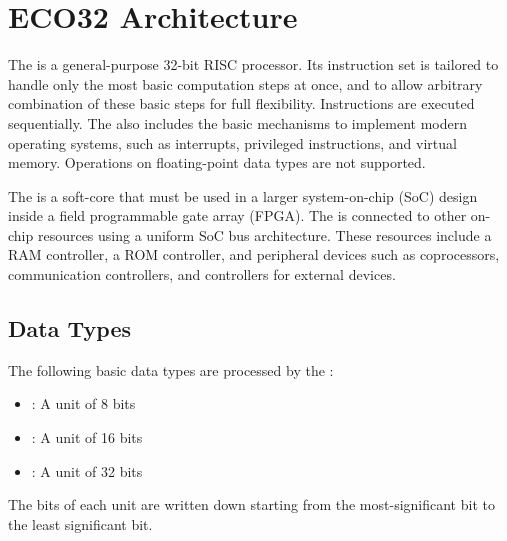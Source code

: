 \chapter{ECO32 Architecture}

The \eco is a general-purpose 32-bit RISC processor. Its instruction set is tailored to handle only the most basic computation steps at once, and to allow arbitrary combination of these basic steps for full flexibility. Instructions are executed sequentially. The \eco also includes the basic mechanisms to implement modern operating systems, such as interrupts, privileged instructions, and virtual memory. Operations on floating-point data types are not supported.

The \eco is a soft-core that must be used in a larger system-on-chip (SoC) design inside a field programmable gate array (FPGA). The \eco is connected to other on-chip resources using a uniform SoC bus architecture. These resources include a RAM controller, a ROM controller, and peripheral devices such as coprocessors, communication controllers, and controllers for external devices.

\section{Data Types}

The following basic data types are processed by the \eco:
\begin{itemize}
\item {}: A unit of 8 bits
\item {}: A unit of 16 bits
\item {}: A unit of 32 bits
\end{itemize}
The bits of each unit are written down starting from the most-significant bit to the least significant bit.


